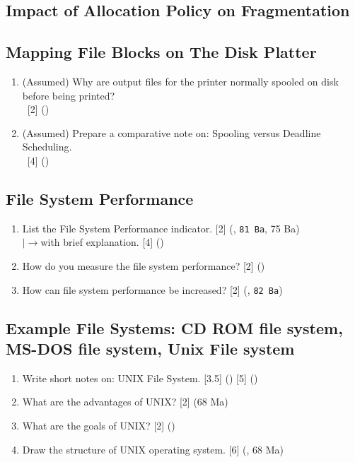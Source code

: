 \documentclass[12pt]{article}
\newcommand{\lb}{\\$\left|\rightarrow\right.$}
\newcommand{\enter}{\\\textcolor{white}{1}}
\begin{document}
	\subsection{Impact of Allocation Policy on Fragmentation}
	\subsection{Mapping File Blocks on The Disk Platter}
		\begin{enumerate}[noitemsep, topsep=0pt]
			\item (Assumed) Why are output files for the printer normally spooled on disk before being printed?
			\enter\hfill [2] ()

			\item (Assumed) Prepare a comparative note on: Spooling versus Deadline Scheduling.
			\enter\hfill [4] ()
		\end{enumerate}
		
	\subsection{File System Performance}
		\begin{enumerate}[noitemsep, topsep=0pt]
			\item List the File System Performance indicator. \hfill [2] (, \texttt{81 Ba}, 75 Ba)
			\lb with brief explanation. \hfill [4] ()

			\item How do you measure the file system performance? \hfill [2] ()
			
			\item How can file system performance be increased? \hfill [2] (, \texttt{82 Ba})
		\end{enumerate}

	\subsection{Example File Systems: CD ROM file system, MS-DOS file system, Unix File system}
		\begin{enumerate}[noitemsep, topsep=0pt]
			\item Write short notes on: UNIX File System. \hfill [3.5] () [5] ()

			\item What are the advantages of UNIX? \hfill [2] (68 Ma)

			\item What are the goals of UNIX? \hfill [2] ()

			\item Draw the structure of UNIX operating system. \hfill [6] (, 68 Ma)
		\end{enumerate}
\end{document}
